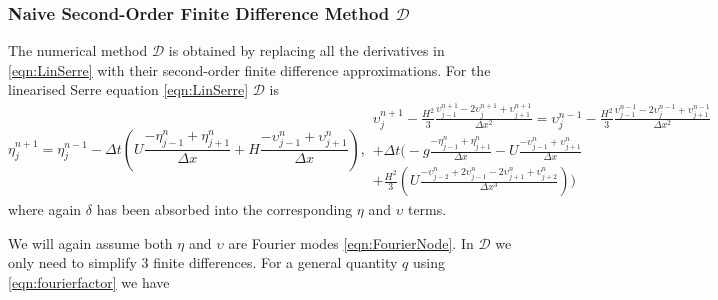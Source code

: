 \subsubsection{Naive Second-Order Finite Difference Method $\mathcal{D}$ }
The numerical method $\mathcal{D}$ is obtained by replacing all the derivatives in \eqref{eqn:LinSerre} with their second-order finite difference approximations. For the linearised Serre equation \eqref{eqn:LinSerre} $\mathcal{D}$ is
\begin{subequations}
\begin{equation}
\eta^{n+1}_j = \eta^{n-1}_j - \Delta t \left(U \frac{- \eta^{n}_{j-1} + \eta^{n}_{j+1} }{\Delta x} + H \frac{- \upsilon^{n}_{j-1} + \upsilon^{n}_{j+1}}{\Delta x}\right),
\end{equation}
\begin{multline}
\upsilon^{n+1}_j - \frac{H^2}{3}\frac{\upsilon^{n+1}_{j-1} -2\upsilon^{n+1}_{j} +\upsilon^{n+1}_{j+1} }{\Delta x^2} 
 =  \upsilon^{n-1}_j - \frac{H^2}{3}\frac{\upsilon^{n-1}_{j-1} -2\upsilon^{n-1}_{j} +\upsilon^{n-1}_{j+1}}{\Delta x^2}   \\+  \Delta t\Bigg(- g\frac{-\eta^n_{j-1} + \eta^n_{j+1} }{\Delta x}   - U\frac{-\upsilon^n_{j-1} + \upsilon^n_{j+1} }{\Delta x}\\ + \frac{H^2}{3}\left(U \frac{-\upsilon^{n}_{j-2} +2\upsilon^{n}_{j-1} -2\upsilon^{n}_{j+1} +\upsilon^{n}_{j+2}}{\Delta x^3}  \right)\Bigg) 
\end{multline}
\label{eqn:DmethforlinSerre}
\end{subequations}
where again $\delta$ has been absorbed into the corresponding $\eta$ and $\upsilon$ terms.

We will again assume both $\eta$ and $\upsilon$ are Fourier modes \eqref{eqn:FourierNode}. In $\mathcal{D}$ we only need to simplify 3 finite differences. For a general quantity $q$ using \eqref{eqn:fourierfactor} we have

